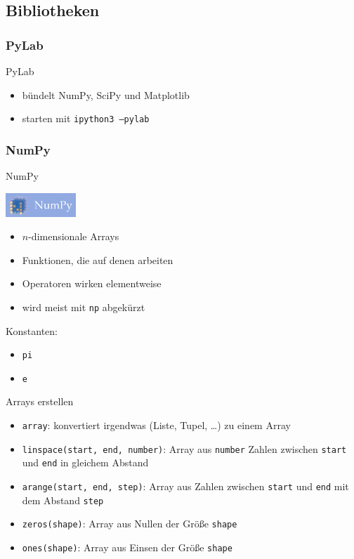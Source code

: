 \subsection{Bibliotheken}
\subsubsection{PyLab}
\begin{frame}{PyLab}
  \begin{itemize}
    \item bündelt NumPy, SciPy und Matplotlib
    \item starten mit \texttt{ipython3 --pylab}
  \end{itemize}
\end{frame}

\subsubsection{NumPy}
\begin{frame}{NumPy}
  \begin{center}
    \includegraphics[width=100px]{../Notes/img/numpy.png}
  \end{center}
  \begin{itemize}
    \item $n$-dimensionale Arrays
    \item Funktionen, die auf denen arbeiten
    \item Operatoren wirken elementweise
    \item wird meist mit \texttt{np} abgekürzt
  \end{itemize}

  Konstanten:
  \begin{itemize}
    \item \texttt{pi}
    \item \texttt{e}
  \end{itemize}
\end{frame}

\begin{frame}{Arrays erstellen}
  \begin{itemize}
    \item \texttt{array}: konvertiert irgendwas (Liste, Tupel, …) zu einem Array
    \item \texttt{linspace(start, end, number)}: Array aus \texttt{number} Zahlen zwischen \texttt{start} und \texttt{end} in gleichem Abstand
    \item \texttt{arange(start, end, step)}: Array aus Zahlen zwischen \texttt{start} und \texttt{end} mit dem Abstand \texttt{step}
    \item \texttt{zeros(shape)}: Array aus Nullen der Größe \texttt{shape}
    \item \texttt{ones(shape)}: Array aus Einsen der Größe \texttt{shape}
  \end{itemize}
\end{frame}


